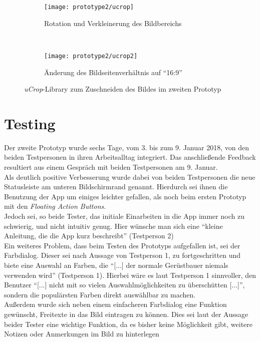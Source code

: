 \begin{figure}[h]
  \begin{subfigure}[t]{0.4\textwidth}
    \centering
    \texttt{[image: prototype2/ucrop]}
    \caption{Rotation und Verkleinerung des Bildbereichs}
  \end{subfigure}
  ~
  \begin{subfigure}[t]{0.4\textwidth}
    \centering
    \texttt{[image: prototype2/ucrop2]}
    \caption{Änderung des Bildseitenverhältnis auf ``16:9''}
  \end{subfigure}
  \centering
  \caption{\emph{uCrop}-Library zum Zuschneiden des Bildes im zweiten Prototyp}
  \label{fig:ucrop}
\end{figure}

\section{Testing}\label{sec:test2}
Der zweite Prototyp wurde sechs Tage, vom 3. bis zum 9. Januar 2018, von den beiden Testpersonen in ihren Arbeitsalltag integriert.
Das anschließende Feedback resultiert aus einem Gespräch mit beiden Testpersonen am 9. Januar. \\

Als deutlich positive Verbesserung wurde dabei von beiden Testpersonen die neue Statusleiste am unteren Bildschirmrand genannt.
Hierdurch sei ihnen die Benutzung der App um einiges leichter gefallen, als noch beim ersten Prototyp mit den \emph{Floating Action Buttons}. \\

Jedoch sei, so beide Tester, das initiale Einarbeiten in die App immer noch zu schwierig, und nicht intuitiv genug.
Hier wünsche man sich eine ``kleine Anleitung, die die App kurz beschreibt'' (Testperson 2) \\

Ein weiteres Problem, dass beim Testen des Prototyps aufgefallen ist, sei der Farbdialog.
Dieser sei nach Aussage von Testperson 1, zu fortgeschritten und biete eine Auswahl an Farben, die ``[...] der normale Gerüstbauer niemals verwenden wird'' (Testperson 1).
Hierbei wäre es laut Testperson 1 sinnvoller, den Benutzer ``[...] nicht mit so vielen Auswahlmöglichkeiten zu überschütten [...]'', sondern die populärsten Farben direkt auswählbar zu machen. \\

Außerdem wurde sich neben einem einfacheren Farbdialog eine Funktion gewünscht, Freitexte in das Bild eintragen zu können. 
Dies sei laut der Aussage beider Tester eine wichtige Funktion, da es bisher keine Möglichkeit gibt, weitere Notizen oder Anmerkungen im Bild zu hinterlegen \\

